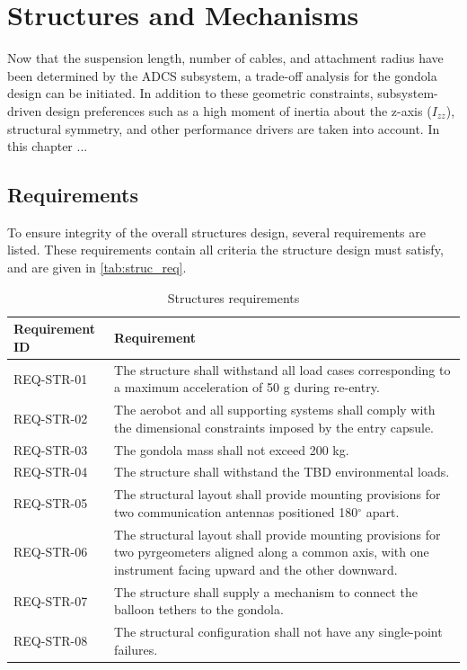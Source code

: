 \chapter{Structures and Mechanisms}
\label{Chap: Structures}
Now that the suspension length, number of cables, and attachment radius have been determined by the ADCS subsystem, a trade-off analysis for the gondola design can be initiated. In addition to these geometric constraints, subsystem-driven design preferences such as a high moment of inertia about the z-axis ($I_{zz}$), structural symmetry, and other performance drivers are taken into account. In this chapter ... 

\section{Requirements}
To ensure integrity of the overall structures design, several requirements are listed. These requirements contain all criteria the structure design must satisfy, and are given in \autoref{tab:struc_req}.


\begin{table}[H]
\centering
\caption{Structures requirements}
\label{tab:struc_req}
\begin{tabular}{ll}
\hline
\textbf{Requirement ID} & \textbf{Requirement} \\
\hline
REQ-STR-01 & The structure shall withstand all load cases corresponding to a maximum acceleration of 50 g during re-entry.\\
REQ-STR-02 & The aerobot and all supporting systems shall comply with the dimensional constraints imposed by the entry capsule. \\
REQ-STR-03 & The gondola mass shall not exceed 200 kg. \\
REQ-STR-04 & The structure shall withstand the TBD environmental loads. \\
REQ-STR-05 & The structural layout shall provide mounting provisions for two communication antennas positioned 180$^\circ$ apart. \\
REQ-STR-06 & The structural layout shall provide mounting provisions for two pyrgeometers aligned along a common axis, with one instrument facing upward and the other downward. \\
REQ-STR-07 & The structure shall supply a mechanism to connect the balloon tethers to the gondola. \\
REQ-STR-08 & The structural configuration shall not have any single-point failures. \\

\end{tabular}
\end{table}


